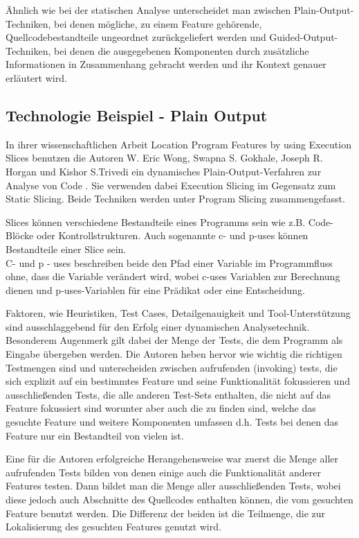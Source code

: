 \documentclass[runningheads,a4paper]{llncs}
\begin{document}
Ähnlich wie bei der statischen Analyse unterscheidet man zwischen Plain-Output-Techniken, bei denen mögliche, zu einem Feature gehörende, Quellcodebestandteile ungeordnet zurückgeliefert werden und Guided-Output-Techniken, bei denen die ausgegebenen Komponenten durch zusätzliche Informationen in Zusammenhang gebracht werden und ihr Kontext genauer erläutert wird. 

\subsection*{Technologie Beispiel - Plain Output}
In ihrer wissenschaftlichen Arbeit Location Program Features by using Execution Slices benutzen die Autoren W. Eric Wong, Swapna S. Gokhale, Joseph R. Horgan und Kishor S.Trivedi ein dynamisches Plain-Output-Verfahren zur Analyse von Code \cite{Executionslices}. Sie verwenden dabei Execution Slicing im Gegensatz zum Static Slicing. Beide 
Techniken werden unter Program Slicing zusammengefasst.

Slices können verschiedene Bestandteile eines Programms sein wie z.B. Code-Blöcke oder Kontrollstrukturen. Auch sogenannte c- und p-uses können Bestandteile einer Slice sein.\\ C- und p - uses beschreiben beide den Pfad einer Variable im Programmfluss ohne, dass die Variable verändert wird, wobei c-uses Variablen zur Berechnung dienen und p-uses-Variablen für eine Prädikat oder eine Entscheidung.

Faktoren, wie Heuristiken, Test Cases, Detailgenauigkeit und Tool-Unterstützung sind ausschlaggebend für den Erfolg einer dynamischen Analysetechnik. Besonderem Augenmerk gilt dabei der Menge der Tests, die dem Programm als Eingabe übergeben werden. Die Autoren heben hervor wie wichtig die richtigen Testmengen sind und unterscheiden zwischen aufrufenden (invoking) tests, die sich explizit auf ein bestimmtes Feature und seine Funktionalität fokussieren und ausschließenden Tests, die alle anderen Test-Sets enthalten, die nicht auf das Feature fokussiert sind worunter aber auch die zu finden sind, welche das gesuchte Feature und weitere Komponenten umfassen d.h. Tests bei denen das Feature nur ein Bestandteil von vielen ist.

Eine für die Autoren erfolgreiche Herangehensweise war zuerst die Menge aller aufrufenden Tests bilden von denen einige auch die Funktionalität anderer Features testen. Dann bildet man die Menge aller ausschließenden Tests, wobei diese jedoch auch Abschnitte des Quellcodes enthalten können, die vom gesuchten Feature benutzt werden. Die Differenz der beiden ist die Teilmenge, die zur Lokalisierung des gesuchten Features genutzt wird.
\end{document}
